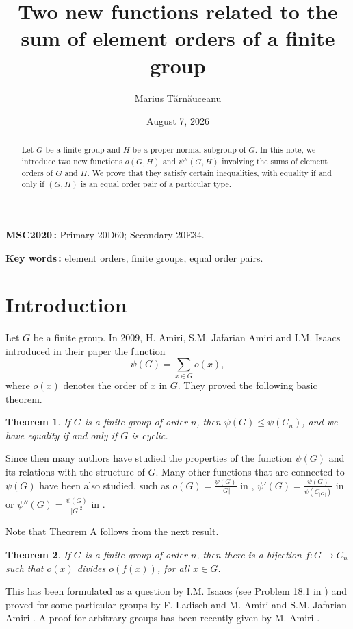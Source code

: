 \documentclass[12pt]{article}
\title{Two new functions related to the sum of element orders of a finite group}
\author{Marius T\u arn\u auceanu}
\date{August 7, 2026}
\newtheorem{thmy}{Theorem}
\newcommand{\0}{{\leqno}}
\begin{document}
\maketitle

\begin{abstract}
Let $G$ be a finite group and $H$ be a proper normal subgroup of $G$. In this note, we introduce two new functions $o(G,H)$ and $\psi''(G,H)$ involving the sums of element orders of $G$ and $H$. We prove that they satisfy certain inequalities, with equality if and only if $(G,H)$ is an equal order pair of a particular type.
\end{abstract}

{\small
\noindent
{\bf MSC2020\,:} Primary 20D60; Secondary 20E34.

\noindent
{\bf Key words\,:} element orders, finite groups, equal order pairs.}

\section{Introduction}

Let $G$ be a finite group. In 2009, H. Amiri, S.M. Jafarian Amiri and I.M. Isaacs introduced in their paper \cite{1} the function
\begin{equation}
\psi(G)=\sum_{x\in G}o(x),\nonumber
\end{equation}where $o(x)$ denotes the order of $x$ in $G$. They proved the following basic theorem.

\begin{thmy}
If $G$ is a finite group of order $n$, then $\psi(G)\leq\psi(C_n)$, and we have equality if and only if $G$ is cyclic.
\end{thmy}Since then many authors have studied the properties of the function $\psi(G)$ and its relations with the structure of $G$. Many other functions that are connected to $\psi(G)$ have been also studied, such as $o(G)=\frac{\psi(G)}{|G|}$ in \cite{11,12,13,14,16,22}, $\psi'(G)=\frac{\psi(G)}{\psi(C_{|G|})}$ in \cite{4,5,8,9,10,21} or $\psi''(G)=\frac{\psi(G)}{|G|^2}$ in \cite{20}.

Note that Theorem A follows from the next result.\newpage

\begin{thmy}
If $G$ is a finite group of order $n$, then there is a bijection $f:G\longrightarrow C_n$ such that $o(x)$ divides $o(f(x))$, for all $x\in G$.
\end{thmy}

This has been formulated as a question by I.M. Isaacs (see Problem 18.1 in \cite{17}) and proved for some particular groups by F. Ladisch \cite{15} and M. Amiri and S.M. Jafarian Amiri \cite{2}. A proof for arbitrary groups has been recently given by M. Amiri \cite{3}. 
\end{document}
